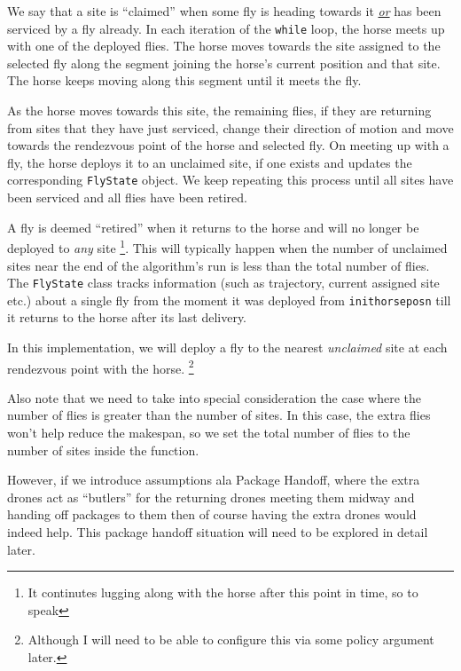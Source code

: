 \documentclass[11.5pt]{report}
\begin{document}

\newchunk We say that a site is ``claimed'' when some fly is heading towards it \underline{\textit{or}} has been 
serviced by a fly already. In each iteration of the \verb|while| loop, the horse meets up with one of the deployed flies. 
The horse moves towards the site assigned to the selected fly along the segment joining the horse's current position 
and that site. The horse keeps moving along this segment until it meets the fly.

As the horse moves towards this site, the remaining flies, if they are returning from sites that they have just serviced, 
change their direction of motion and move towards the rendezvous point of the horse and selected fly. 
On meeting up with a fly, the horse deploys it to an unclaimed site, if one exists and updates the corresponding \verb|FlyState|
object. We keep repeating this process until all sites have been serviced and all flies have been retired. 

A fly is deemed ``retired'' when it returns to the horse and will no longer be deployed to \textit{any} site 
\footnote{It continutes lugging along with the horse after this point in time, so to speak}. This will 
typically happen when the number of unclaimed sites near the end of the algorithm's run is less than the total number of flies. 
The \verb|FlyState| class tracks information (such as trajectory, current assigned site etc.) 
about a single fly from the moment it was deployed from  \verb|inithorseposn| till it returns to the horse after its 
last delivery.

In this implementation,  we will deploy a fly to the nearest \textit{unclaimed} site at each rendezvous point with the horse.  
\footnote{Although I will need to be able to configure this via some policy argument later.}

Also note that we need to take into special consideration the case where the number of flies is greater than the number of sites. 
In this case, the extra flies won't help reduce the makespan, so we set the total number of flies to the number of sites inside 
the function. 

However, if we introduce assumptions ala Package Handoff, where the extra drones act as ``butlers'' for the returning drones 
meeting them midway and handing off packages to them then of course having the extra drones would indeed help. This package
handoff situation will need to be explored in detail later. 
\end{document}
